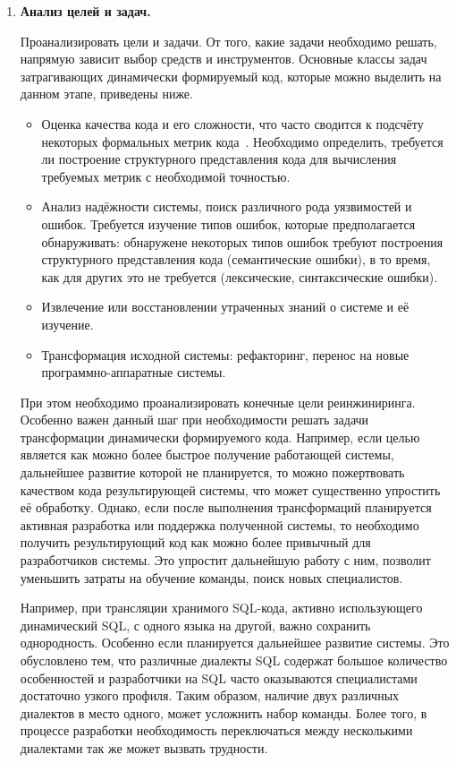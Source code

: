 \begin{enumerate}
  \item \textbf{Анализ целей и задач.}
  
  Проанализировать цели и задачи. От того, какие задачи необходимо решать, напрямую зависит выбор средств и инструментов. Основные классы задач затрагивающих динамически формируемый код, которые можно выделить на данном этапе, приведены ниже.
  
  \begin{itemize}
    \item Оценка качества кода и его сложности, что часто сводится к подсчёту некоторых формальных метрик кода~\cite{SoftwareMetrics, DSQLQualityMesureBIG}. Необходимо определить, требуется ли построение структурного представления кода для вычисления требуемых метрик с необходимой точностью.
    \item Анализ надёжности системы, поиск различного рода уязвимостей и ошибок. Требуется изучение типов ошибок, которые предполагается обнаруживать: обнаружене некоторых типов ошибок требуют построения структурного представления кода (семантические ошибки), в то время, как для других это не требуется (лексические, синтаксические ошибки).
    \item Извлечение или восстановлении утраченных знаний о системе и её изучение.
    \item Трансформация исходной системы: рефакторинг, перенос на новые программно-аппаратные системы.
  \end{itemize}
  
  При этом необходимо проанализировать конечные цели реинжиниринга. Особенно важен данный шаг при необходимости решать задачи трансформации динамически формируемого кода. Например, если целью является как можно более быстрое получение работающей системы, дальнейшее развитие которой не планируется, то можно пожертвовать качеством кода результирующей системы, что может существенно упростить её обработку. Однако, если после выполнения трансформаций планируется активная разработка или поддержка полученной системы, то необходимо получить результирующий код как можно более привычный для разработчиков системы. Это упростит дальнейшую работу с ним, позволит уменьшить затраты на обучение команды, поиск новых специалистов.
  
  Например, при трансляции хранимого SQL-кода, активно использующего динамический SQL, с одного языка на другой, важно сохранить однородность. Особенно если планируется дальнейшее развитие системы. Это обусловлено тем, что различные диалекты SQL содержат большое количество особенностей и разработчики на SQL часто оказываются специалистами достаточно узкого профиля. Таким образом, наличие двух различных диалектов в место одного, может усложнить набор команды. Более того, в процессе разработки необходимость переключаться между несколькими диалектами так же может вызвать трудности.
  

\end{enumerate}
